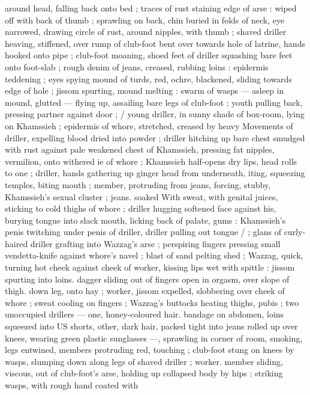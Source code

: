 {around head, falling back onto bed ; traces of rust staining edge of 
arse : wiped off with back of thumb ; sprawling on back, chin buried 
in folds of neck, eye narrowed, drawing circle of rust, around 
nipples, with thumb ; shaved driller heaving, stiffened, over rump of 
club-foot bent over towards hole of latrine, hands hooked onto pipe 
; club-foot moaning, shoed feet of driller squashing bare feet onto 
foot-slab ; rough denim of jeans, creased, rubbing loins : epidermis 
teddening ; eyes spying mound of turds, red, ochre, blackened, 
sliding towards edge of hole ; jissom spurting, mound melting : 
swarm of wasps --- asleep in mound, glutted --- flying up, assailing 
bare legs of club-foot ; youth pulling back, pressing partner against 
door ; {\slash} young driller, in sunny shade of box-room, lying on 
Khamssieh ; epidermis of whore, stretched, creased by heavy 
Movements of driller, expelling blood dried into powder ; driller 
hitching up bare chest smudged with rust against pale weakened 
chest of Khamssieh, pressing fat nipples, vermilion, onto withered 
ie of whore ; Khamssieh half-opens dry lips, head rolls to one 
; driller, hands gathering up ginger head from underneath, 
iting, squeezing temples, biting mouth ; member, protruding from 
jeans, forcing, stubby, Khamssieh's sexual cluster ; jeans. soaked 
With sweat, with genital juices, sticking to cold thighs of whore ; 
driller hugging softened face against his, burying tongue into slack 
mouth, licking back of palate, gums : Khamssieh's penis twitching 
under penis of driller, driller pulling out tongue {\slash} ; glans of curly- 
haired driller grafting into Wazzag's arse ; perspiring fingers 
pressing small vendetta-knife against whore's navel ; blast of sand 
pelting shed ; Wazzag, quick, turning hot cheek against cheek of 
worker, kissing lips wet with spittle : jissom spurting into loins. 
dagger sliding out of fingers open in orgasm, over slope of thigh. 
down leg, onto hay ; worker, jissom expelled, slobbering over cheek 
of whore ; sweat cooling on fingers ; Wazzag's buttocks heating 
thighs, pubis ; two unoccupied drillers --- one, honey-coloured hair. 
bandage on abdomen, loins squeezed into US shorts, other, dark 
hair, packed tight into jeans rolled up over knees, wearing green 
plastic sunglasses ---, sprawling in corner of room, smoking, legs 
entwined, members protruding red, touching ; club-foot stung on 
knees by wasps, slumping down along legs of shaved driller ; worker. 
member sliding, viscous, out of club-foot's arse, holding up 
collapsed body by hips ; striking wasps, with rough hand coated with 
}
